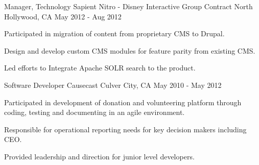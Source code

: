 \begin{cventries}
  \cventry
    {Manager, Technology} %
    {Sapient Nitro - Disney Interactive Group Contract} %
    {North Hollywood, CA} %
    {May 2012 - Aug 2012} %
    {
      \begin{cvitems} %
        \item {Participated in migration of content from proprietary CMS to Drupal.}
        \item {Design and develop custom CMS modules for feature parity from existing CMS.}
        \item {Led efforts to Integrate Apache SOLR search to the product.}
      \end{cvitems}
    }

  \cventry
    {Software Developer} %
    {Causecast} %
    {Culver City, CA} %
    {May 2010 - May 2012} %
    {
      \begin{cvitems} %
        \item {Participated in development of donation and volunteering platform through coding, testing and documenting in an agile environment.}
        \item {Responsible for operational reporting needs for key decision makers including CEO.}
        \item {Provided leadership and direction for junior level developers.}
      \end{cvitems}
    }
\end{cventries}
